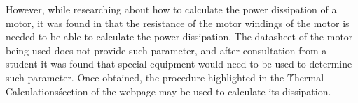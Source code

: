		However, while researching about how to calculate the power dissipation of a motor, it was found in \cite{ref:servo2} that the resistance of the motor windings of the motor is needed to be able to calculate the power dissipation. The datasheet of the motor being used does not provide such parameter, and after consultation from a student it was found that special equipment would need to be used to determine such parameter. Once obtained, the procedure highlighted in the \'Thermal Calculations\'   section of the webpage may be used to calculate its dissipation.
